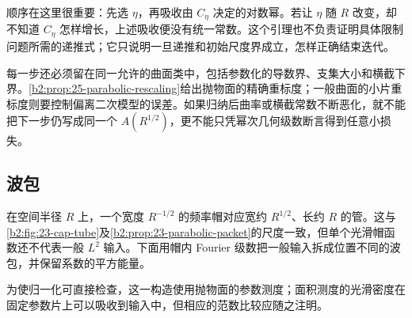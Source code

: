 顺序在这里很重要：先选 \(\eta\)，再吸收由 \(C_\eta\) 决定的对数幂。若让 \(\eta\) 随 \(R\) 改变，却不知道 \(C_\eta\) 怎样增长，上述吸收便没有统一常数。这个引理也不负责证明具体限制问题所需的递推式；它只说明一旦递推和初始尺度界成立，怎样正确结束迭代。

\ProseParagraphBreak
每一步还必须留在同一允许的曲面类中，包括参数化的导数界、支集大小和横截下界。\cref{b2:prop:25-parabolic-rescaling}给出抛物面的精确重标度；一般曲面的小片重标度则要控制偏离二次模型的误差。如果归纳后曲率或横截常数不断恶化，就不能把下一步仍写成同一个 \(A(R^{1/2})\)，更不能只凭幂次几何级数断言得到任意小损失。

\subsection{波包}
\label{b2:subsec:250502}

在空间半径 \(R\) 上，一个宽度 \(R^{-1/2}\) 的频率帽对应宽约 \(R^{1/2}\)、长约 \(R\) 的管。这与\cref{b2:fig:23-cap-tube}及\cref{b2:prop:23-parabolic-packet}的尺度一致，但单个光滑帽函数还不代表一般 \(L^2\) 输入。下面用帽内 Fourier 级数把一般输入拆成位置不同的波包，并保留系数的平方能量。

\ProseParagraphBreak
为使归一化可直接检查，这一构造使用抛物面的参数测度；面积测度的光滑密度在固定参数片上可以吸收到输入中，但相应的范数比较应随之注明。

